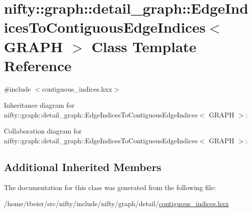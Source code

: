 \hypertarget{classnifty_1_1graph_1_1detail__graph_1_1EdgeIndicesToContiguousEdgeIndices}{}\section{nifty\+:\+:graph\+:\+:detail\+\_\+graph\+:\+:Edge\+Indices\+To\+Contiguous\+Edge\+Indices$<$ G\+R\+A\+P\+H $>$ Class Template Reference}
\label{classnifty_1_1graph_1_1detail__graph_1_1EdgeIndicesToContiguousEdgeIndices}


{\ttfamily \#include $<$contiguous\+\_\+indices.\+hxx$>$}



Inheritance diagram for nifty\+:\+:graph\+:\+:detail\+\_\+graph\+:\+:Edge\+Indices\+To\+Contiguous\+Edge\+Indices$<$ G\+R\+A\+P\+H $>$\+:


Collaboration diagram for nifty\+:\+:graph\+:\+:detail\+\_\+graph\+:\+:Edge\+Indices\+To\+Contiguous\+Edge\+Indices$<$ G\+R\+A\+P\+H $>$\+:
\subsection*{Additional Inherited Members}


The documentation for this class was generated from the following file\+:\begin{DoxyCompactItemize}
\item 
/home/tbeier/src/nifty/include/nifty/graph/detail/\hyperlink{contiguous__indices_8hxx}{contiguous\+\_\+indices.\+hxx}\end{DoxyCompactItemize}
